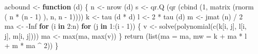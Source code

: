 \documentclass[
  12pt,
  letterpaper,
  DIV=11,
  numbers=noendperiod]{scrreprt}
\newenvironment{Shaded}{\begin{snugshade}}{\end{snugshade}}
\newcommand{\AttributeTok}[1]{\textcolor[rgb]{0.40,0.45,0.13}{#1}}
\newcommand{\ConstantTok}[1]{\textcolor[rgb]{0.56,0.35,0.01}{#1}}
\newcommand{\ControlFlowTok}[1]{\textcolor[rgb]{0.00,0.23,0.31}{\textbf{#1}}}
\newcommand{\DecValTok}[1]{\textcolor[rgb]{0.68,0.00,0.00}{#1}}
\newcommand{\FunctionTok}[1]{\textcolor[rgb]{0.28,0.35,0.67}{#1}}
\newcommand{\NormalTok}[1]{\textcolor[rgb]{0.00,0.23,0.31}{#1}}
\newcommand{\OtherTok}[1]{\textcolor[rgb]{0.00,0.23,0.31}{#1}}
\newcommand{\SpecialCharTok}[1]{\textcolor[rgb]{0.37,0.37,0.37}{#1}}
\theoremstyle{remark}
\begin{document}
\begin{Shaded}
\begin{Highlighting}[]
\NormalTok{acbound }\OtherTok{\textless{}{-}} \ControlFlowTok{function}\NormalTok{ (d) \{}
\NormalTok{  n }\OtherTok{\textless{}{-}} \FunctionTok{nrow}\NormalTok{ (d)}
\NormalTok{  s }\OtherTok{\textless{}{-}} \FunctionTok{qr.Q}\NormalTok{ (}\FunctionTok{qr}\NormalTok{ (}\FunctionTok{cbind}\NormalTok{ (}\DecValTok{1}\NormalTok{, }\FunctionTok{matrix}\NormalTok{ (}\FunctionTok{rnorm}\NormalTok{ (}
\NormalTok{    n }\SpecialCharTok{*}\NormalTok{ (n }\SpecialCharTok{{-}} \DecValTok{1}\NormalTok{)}
\NormalTok{  ), n, n }\SpecialCharTok{{-}} \DecValTok{1}\NormalTok{))))}
\NormalTok{  k }\OtherTok{\textless{}{-}} \FunctionTok{tau}\NormalTok{ (d }\SpecialCharTok{*}\NormalTok{ d)}
\NormalTok{  l }\OtherTok{\textless{}{-}} \DecValTok{2} \SpecialCharTok{*} \FunctionTok{tau}\NormalTok{ (d)}
\NormalTok{  m }\OtherTok{\textless{}{-}} \FunctionTok{jmat}\NormalTok{ (n) }\SpecialCharTok{/} \DecValTok{2}
\NormalTok{  ma }\OtherTok{\textless{}{-}} \SpecialCharTok{{-}}\ConstantTok{Inf}
  \ControlFlowTok{for}\NormalTok{ (i }\ControlFlowTok{in} \DecValTok{2}\SpecialCharTok{:}\NormalTok{n)}
    \ControlFlowTok{for}\NormalTok{ (j }\ControlFlowTok{in} \DecValTok{1}\SpecialCharTok{:}\NormalTok{(i }\SpecialCharTok{{-}} \DecValTok{1}\NormalTok{)) \{}
\NormalTok{      v }\OtherTok{\textless{}{-}} \FunctionTok{solve}\NormalTok{(}\FunctionTok{polynomial}\NormalTok{(}\FunctionTok{c}\NormalTok{(k[i, j], l[i, j], m[i, j])))}
\NormalTok{      ma }\OtherTok{\textless{}{-}} \FunctionTok{max}\NormalTok{(ma, }\FunctionTok{max}\NormalTok{(v))}
\NormalTok{    \}}
  \FunctionTok{return}\NormalTok{ (}\FunctionTok{list}\NormalTok{(}\AttributeTok{ma =}\NormalTok{ ma, }\AttributeTok{mw =}\NormalTok{ k }\SpecialCharTok{+}\NormalTok{ ma }\SpecialCharTok{*}\NormalTok{ l }\SpecialCharTok{+}\NormalTok{ m }\SpecialCharTok{*}\NormalTok{ ma }\SpecialCharTok{\^{}} \DecValTok{2}\NormalTok{))}
\NormalTok{\}}


\end{Highlighting}
\end{Shaded}
\end{document}
